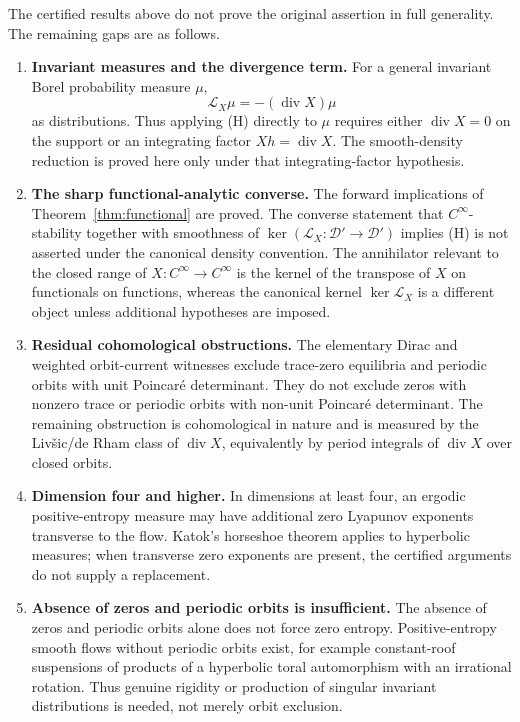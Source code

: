 \documentclass[12pt]{article}
\theoremstyle{definition}
\newcommand{\D}{\mathcal{D}}
\DeclareMathOperator{\Div}{div}
\begin{document}
The certified results above do not prove the original assertion in full generality.  The remaining gaps are as follows.

\begin{enumerate}
\item \textbf{Invariant measures and the divergence term.}
For a general invariant Borel probability measure \(\mu\),
\[
\mathcal L_X\mu=-(\Div X)\mu
\]
as distributions.  Thus applying (H) directly to \(\mu\) requires either \(\Div X=0\) on the support or an integrating factor \(Xh=\Div X\).  The smooth-density reduction is proved here only under that integrating-factor hypothesis.

\item \textbf{The sharp functional-analytic converse.}
The forward implications of Theorem~\ref{thm:functional} are proved.  The converse statement that \(C^\infty\)-stability together with smoothness of \(\ker(\mathcal L_X:\D'\to\D')\) implies (H) is not asserted under the canonical density convention.  The annihilator relevant to the closed range of \(X:C^\infty\to C^\infty\) is the kernel of the transpose of \(X\) on functionals on functions, whereas the canonical kernel \(\ker\mathcal L_X\) is a different object unless additional hypotheses are imposed.

\item \textbf{Residual cohomological obstructions.}
The elementary Dirac and weighted orbit-current witnesses exclude trace-zero equilibria and periodic orbits with unit Poincar\'e determinant.  They do not exclude zeros with nonzero trace or periodic orbits with non-unit Poincar\'e determinant.  The remaining obstruction is cohomological in nature and is measured by the Liv\v{s}ic/de Rham class of \(\Div X\), equivalently by period integrals of \(\Div X\) over closed orbits.

\item \textbf{Dimension four and higher.}
In dimensions at least four, an ergodic positive-entropy measure may have additional zero Lyapunov exponents transverse to the flow.  Katok's horseshoe theorem applies to hyperbolic measures; when transverse zero exponents are present, the certified arguments do not supply a replacement.

\item \textbf{Absence of zeros and periodic orbits is insufficient.}
The absence of zeros and periodic orbits alone does not force zero entropy.  Positive-entropy smooth flows without periodic orbits exist, for example constant-roof suspensions of products of a hyperbolic toral automorphism with an irrational rotation.  Thus genuine rigidity or production of singular invariant distributions is needed, not merely orbit exclusion.
\end{enumerate}
\end{document}
